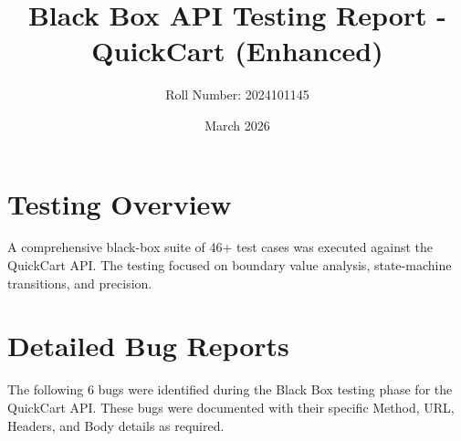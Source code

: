 \documentclass{article}
\title{Black Box API Testing Report - QuickCart (Enhanced)}
\author{Roll Number: 2024101145}
\date{March 2026}
\begin{document}
\maketitle

\section{Testing Overview}
A comprehensive black-box suite of 46+ test cases was executed against the QuickCart API. The testing focused on boundary value analysis, state-machine transitions, and precision.

\section{Detailed Bug Reports}
The following 6 bugs were identified during the Black Box testing phase for the QuickCart API. These bugs were documented with their specific Method, URL, Headers, and Body details as required.
\end{document}
